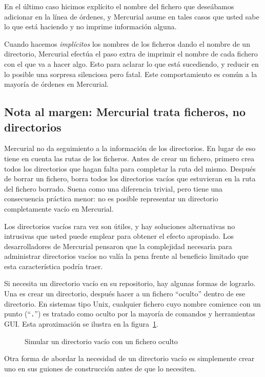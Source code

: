 En el último caso hicimos explícito el nombre del fichero que
deseábamos adicionar en la línea de órdenes, y Mercurial asume en
tales casos que usted sabe lo que está haciendo y no imprime
información alguna.

Cuando hacemos \emph{implícitos} los nombres de los ficheros dando el
nombre de un directorio, Mercurial efectúa el paso extra de imprimir
el nombre de cada fichero con el que va a hacer algo.  Esto para
aclarar lo que está sucediendo, y reducir en lo posible una sorpresa
silenciosa pero fatal.  Este comportamiento es común a la mayoría de
órdenes en Mercurial.

\subsection{Nota al margen: Mercurial trata ficheros, no directorios}

Mercurial no da seguimiento a la información de los directorios.  En
lugar de eso tiene en cuenta las rutas de los ficheros.  Antes  de
crear un fichero, primero crea todos los directorios que hagan falta
para completar la ruta del mismo. Después de borrar un fichero,
borra todos los directorios vacíos que estuvieran en la ruta del
fichero borrado. Suena como una diferencia trivial, pero tiene una
consecuencia práctica menor: no es posible representar un directorio
completamente vacío en Mercurial.

Los directorios vacíos rara vez son útiles, y hay soluciones
alternativas no intrusivas que usted puede emplear para obtener el efecto
apropiado. Los desarrolladores de Mercurial pensaron que la
complejidad necesaria para administrar directorios vacíos no valía la
pena frente al beneficio limitado que esta característica podría traer.

Si necesita un directorio vacío en su repositorio, hay algunas formas
de lograrlo. Una es crear un directorio, después hacer  a
un fichero ``oculto'' dentro de ese directorio. En sistemas tipo
Unix, cualquier fichero cuyo nombre comience con un punto
(``\texttt{.}'') es tratado como oculto por la mayoría de
comandos y herramientas GUI. Esta aproximación se ilustra en la figura~\ref{ex:daily:hidden}.

\begin{figure}[ht]
  \caption{Simular un directorio vacío con un fichero oculto}
  \label{ex:daily:hidden}
\end{figure}

Otra forma de abordar la necesidad de un directorio vacío es
simplemente crear uno en sus guiones de construcción antes de que lo
necesiten.

